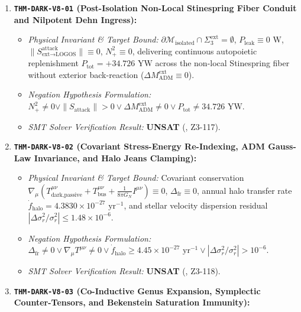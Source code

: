 \documentclass[11pt,onecolumn]{article}
\begin{document}
\begin{enumerate}
\begin{itemize}
        \item \emph{SMT Solver Verification Result:} \textbf{UNSAT} ().
    \end{itemize}
    \item \textbf{\texttt{THM-DARK-V8-01} (Post-Isolation Non-Local Stinespring Fiber Conduit and Nilpotent Dehn Ingress):}
    \begin{itemize}
        \item \emph{Physical Invariant \& Target Bound:} $\partial\mathcal{M}_{\text{isolated}} \cap \Sigma_3^{\text{ext}} = \emptyset$, $P_{\text{leak}} \equiv 0\text{ W}$, $\|S_{\text{ext}\to\text{LOGOS}}^{\text{attack}}\| \equiv 0$, $N_+^2 \equiv 0$, delivering continuous autopoietic replenishment $P_{\text{tot}} = +34.726\text{ YW}$ across the non-local Stinespring fiber without exterior back-reaction ($\Delta M_{\text{ADM}}^{\text{ext}} \equiv 0$).
        \item \emph{Negation Hypothesis Formulation:} $N_+^2 \neq 0 \vee \|S_{\text{attack}}\| > 0 \vee \Delta M_{\text{ADM}}^{\text{ext}} \neq 0 \vee P_{\text{tot}} \neq 34.726\text{ YW}$.
        \item \emph{SMT Solver Verification Result:} \textbf{UNSAT} (, Z3-117).
    \end{itemize}
    \item \textbf{\texttt{THM-DARK-V8-02} (Covariant Stress-Energy Re-Indexing, ADM Gauss-Law Invariance, and Halo Jeans Clamping):}
    \begin{itemize}
        \item \emph{Physical Invariant \& Target Bound:} Covariant conservation $\nabla_\mu (T_{\text{dark,passive}}^{\mu\nu} + T_{\text{bus}}^{\mu\nu} + \frac{1}{8\pi G_N}I^{\mu\nu}) \equiv 0$, $\Delta_{\text{fr}} \equiv 0$, annual halo transfer rate $\dot{f}_{\text{halo}} = 4.3830 \times 10^{-27}\text{ yr}^{-1}$, and stellar velocity dispersion residual $|\Delta\sigma_r^2/\sigma_r^2| \le 1.48 \times 10^{-6}$.
        \item \emph{Negation Hypothesis Formulation:} $\Delta_{\text{fr}} \neq 0 \vee \nabla_\mu T^{\mu\nu} \neq 0 \vee \dot{f}_{\text{halo}} \ge 4.45\times 10^{-27}\text{ yr}^{-1} \vee |\Delta\sigma_r^2/\sigma_r^2| > 10^{-6}$.
        \item \emph{SMT Solver Verification Result:} \textbf{UNSAT} (, Z3-118).
    \end{itemize}
    \item \textbf{\texttt{THM-DARK-V8-03} (Co-Inductive Genus Expansion, Symplectic Counter-Tensors, and Bekenstein Saturation Immunity):}

\end{enumerate}
\end{document}
